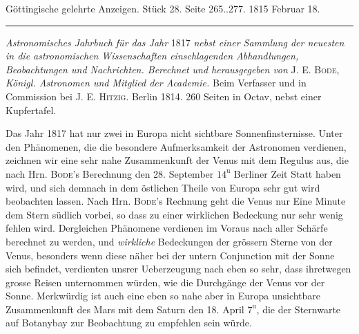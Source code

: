 \clearpage
{}
\hypertarget{native-581-lower}{}
\begin{center}\small Göttingische gelehrte Anzeigen. Stück 28. Seite 265..277. 1815 Februar 18.\\[3pt]\rule{.72\linewidth}{.3pt}\end{center}

\emph{Astronomisches Jahrbuch für das Jahr} 1817 \emph{nebst einer Sammlung der neuesten in die
astronomischen Wissenschaften einschlagenden Abhandlungen, Beobachtungen und Nachrichten.
Berechnet und herausgegeben von} J. E. \textsc{Bode}, \emph{Königl. Astronomen und Mitglied der
Academie.} Beim Verfasser und in Commission bei J. E. \textsc{Hitzig}. 
Berlin 1814. 260 Seiten in Octav, nebst einer Kupfertafel.

Das Jahr 1817 hat nur zwei in Europa nicht sichtbare Sonnenfinsternisse. Unter den Phänomenen,
die die besondere Aufmerksamkeit der Astronomen verdienen, zeichnen wir eine sehr nahe
Zusammenkunft der Venus mit dem Regulus aus, die nach Hrn. \textsc{Bode}'s Berechnung den
28. September $14^{\mathrm{u}}$ Berliner Zeit Statt haben wird, und sich demnach in dem
östlichen Theile von Europa sehr gut wird beobachten lassen. Nach Hrn. \textsc{Bode}'s Rechnung
geht die Venus nur Eine Minute dem Stern südlich vorbei, so dass zu einer wirklichen Bedeckung
nur sehr wenig fehlen wird. Dergleichen Phänomene verdienen im Voraus nach aller Schärfe berechnet
zu werden, und \emph{wirkliche} Bedeckungen der grössern Sterne von der Venus, besonders wenn
diese näher bei der untern Conjunction mit der Sonne sich befindet, verdienten unsrer Ueberzeugung
nach eben so sehr, dass ihretwegen grosse Reisen unternommen würden, wie die Durchgänge der Venus
vor der Sonne. Merkwürdig ist auch eine eben so nahe aber in Europa unsichtbare Zusammenkunft des
Mars mit dem Saturn den 18. April $7^{\mathrm{u}}$, die der Sternwarte auf Botanybay zur
Beobachtung zu empfehlen sein würde.

